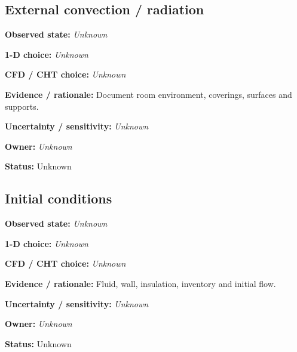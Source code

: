 \documentclass[11pt]{article}
\begin{document}
\par\noindent\begin{minipage}{\textwidth}\small\setlength{\parskip}{2pt}
\subsection*{External convection / radiation}
\textbf{Observed state:} \textit{Unknown}\par
\textbf{1-D choice:} \textit{Unknown}\par
\textbf{CFD / CHT choice:} \textit{Unknown}\par
\textbf{Evidence / rationale:} Document room environment, coverings, surfaces and supports.\par
\textbf{Uncertainty / sensitivity:} \textit{Unknown}\par
\textbf{Owner:} \textit{Unknown}\par
\textbf{Status:} Unknown\par
\end{minipage}\par\vspace{5pt}
\par\noindent\begin{minipage}{\textwidth}\small\setlength{\parskip}{2pt}
\subsection*{Initial conditions}
\textbf{Observed state:} \textit{Unknown}\par
\textbf{1-D choice:} \textit{Unknown}\par
\textbf{CFD / CHT choice:} \textit{Unknown}\par
\textbf{Evidence / rationale:} Fluid, wall, insulation, inventory and initial flow.\par
\textbf{Uncertainty / sensitivity:} \textit{Unknown}\par
\textbf{Owner:} \textit{Unknown}\par
\textbf{Status:} Unknown\par
\end{minipage}\par\vspace{5pt}
\end{document}
